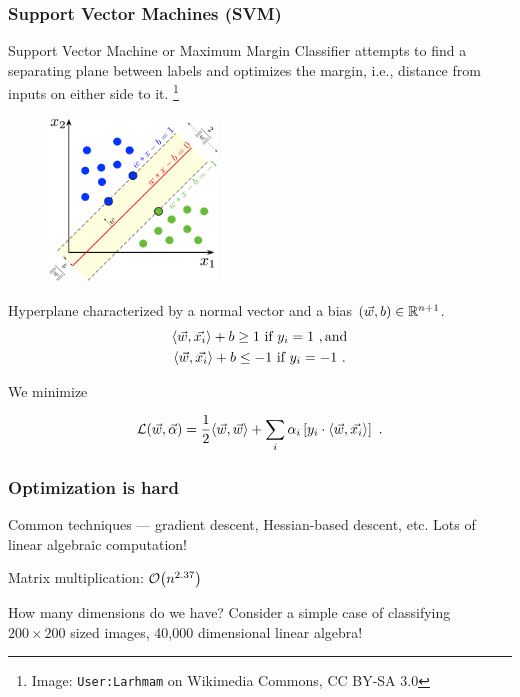 \begin{frame}
    \frametitle{Support Vector Machines (SVM)}

    Support Vector Machine or Maximum Margin Classifier attempts to find a
    separating plane between labels and optimizes the margin, i.e., distance
    from inputs on either side to it.
    \footnote{Image: \texttt{User:Larhmam} on Wikimedia Commons, CC BY-SA 3.0}

    \begin{multicols}{2}
        \begin{figure}
            \includegraphics[width=0.4\textwidth]{figures/svmmargin.png}
        \end{figure}
        Hyperplane characterized by a normal vector and a bias \((\vec{w}, b) \in
        \mathbb{R}^{n+1}\).
        \begin{gather*}
            \langle \vec{w}, \vec{x_i}\rangle + b \geq 1 \text{ if } y_i = 1~, \text{and}\\
            \langle \vec{w}, \vec{x_i}\rangle + b \leq -1 \text{ if } y_i = -1~.
        \end{gather*}

        We minimize

        \begin{equation*}
            \mathcal{L}(\vec{w}, \vec{\alpha}) = \frac{1}{2} \langle \vec{w}, \vec{w}\rangle + \sum_i \alpha_i \left[y_i \cdot \langle \vec{w}, \vec{x_i}\rangle\right]~.
        \end{equation*}
    \end{multicols}

\end{frame}

\begin{frame}
    \frametitle{Optimization is hard}

    Common techniques --- gradient descent, Hessian-based descent, etc.
    Lots of linear algebraic computation! 

    Matrix multiplication: \(\order{n^{2.37}}\)

    How many dimensions do we have? Consider a simple case of classifying
    \(200\times 200\) sized images, 40,000 dimensional linear algebra!

\end{frame}

